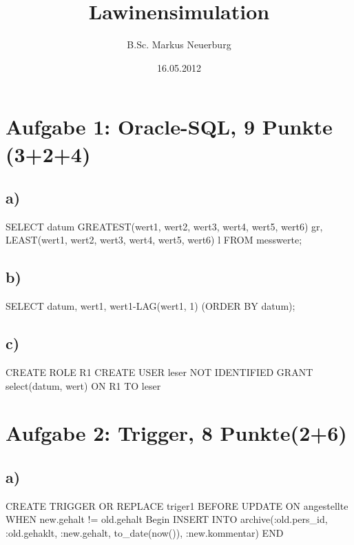 \documentclass[12pt]{scrreprt}
\title{Lawinensimulation}
\author{B.Sc. Markus Neuerburg}
\date{16.05.2012}
\begin{document}
\section*{Aufgabe 1: Oracle-SQL, 9 Punkte (3+2+4)}
\subsection*{a)}
SELECT datum GREATEST(wert1, wert2, wert3, wert4, wert5, wert6) gr,\newline
\hspace*{5mm}LEAST(wert1, wert2, wert3, wert4, wert5, wert6) l\newline
\hspace*{5mm}FROM messwerte;\newline
\subsection*{b)}
SELECT datum, wert1, wert1-LAG(wert1, 1)\newline
\hspace*{5mm}(ORDER BY datum);\newline
\subsection*{c)}
CREATE ROLE R1\newline
CREATE USER leser NOT IDENTIFIED\newline
GRANT select(datum, wert) ON R1 TO leser\newline
\section*{Aufgabe 2: Trigger, 8 Punkte(2+6)}
\subsection*{a)}
CREATE TRIGGER OR REPLACE triger1\newline
\hspace*{5mm}BEFORE UPDATE ON angestellte\newline
\hspace*{5mm}WHEN new.gehalt != old.gehalt\newline
Begin\newline
\hspace*{5mm}INSERT INTO archive(:old.pers\_id, :old.gehaklt, :new.gehalt, to\_date(now()), :new.kommentar)\newline
END\newline
\end{document}
